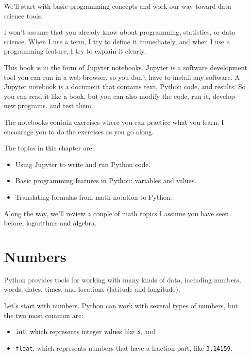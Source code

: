We'll start with basic programming concepts and work our way toward data
science tools.

I won't assume that you already know about programming, statistics, or
data science. When I use a term, I try to define it immediately, and
when I use a programming feature, I try to explain it clearly.

This book is in the form of Jupyter notebooks. Jupyter is a software
development tool you can run in a web browser, so you don't have to
install any software. A Jupyter notebook is a document that contains
text, Python code, and results. So you can read it like a book, but you
can also modify the code, run it, develop new programs, and test them.

The notebooks contain exercises where you can practice what you learn. I
encourage you to do the exercises as you go along.

The topics in this chapter are:

\begin{itemize}
\item
  Using Jupyter to write and run Python code.
\item
  Basic programming features in Python: variables and values.
\item
  Translating formulas from math notation to Python.
\end{itemize}

Along the way, we'll review a couple of math topics I assume you have
seen before, logarithms and algebra.

\hypertarget{numbers}{%
\section{Numbers}\label{numbers}}

Python provides tools for working with many kinds of data, including
numbers, words, dates, times, and locations (latitude and longitude).

Let's start with numbers. Python can work with several types of numbers,
but the two most common are:

\begin{itemize}
\item
  \passthrough{\lstinline!int!}, which represents integer values like
  \passthrough{\lstinline!3!}, and
\item
  \passthrough{\lstinline!float!}, which represents numbers that have a
  fraction part, like \passthrough{\lstinline!3.14159!}.
\end{itemize}

